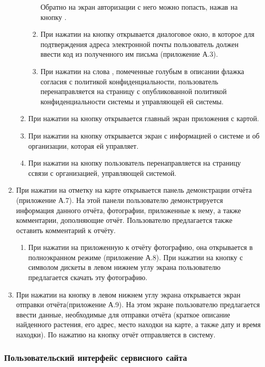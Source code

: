 \begin{enumerate}
\begin{enumerate}
\begin{enumerate}
			Обратно на экран авторизации с него можно попасть, нажав на кнопку .
			\item При нажатии на кнопку  открывается диалоговое окно, в которое для подтверждения адреса электронной почты пользователь должен ввести код из полученного им письма (приложение А.3).
			\item При нажатии на слова , помеченные голубым в описании флажка согласия с политикой конфиденциальности, пользователь перенаправляется на страницу с опубликованной политикой конфиденциальности системы и управляющей ей системы.
		\end{enumerate}
		\item При нажатии на кнопку  открывается главный экран приложения с картой.
		\item При нажатии на кнопку  открывается экран с информацией о системе и об организации, которая ей управляет.
		\item При нажатии на кнопку  пользователь перенаправляется на страницу ссвязи с организацией, управляющей системой.
	\end{enumerate}
	\item При нажатии на отметку на карте открывается панель демонстрации отчёта (приложение А.7).
	На этой панели пользователю демонстрируется информация данного отчёта, фотографии, приложенные к нему, а также комментарии, дополняющие отчёт.
	Пользователю предлагается также оставить комментарий к отчёту.
	\begin{enumerate}
		\item При нажатии на приложенную к отчёту фотографию, она открывается в полноэкранном режиме (приложение А.8).
		При нажатии на кнопку с символом дискеты в левом нижнем углу экрана пользователю предлагается скачать эту фотографию.
	\end{enumerate}
	\item При нажатии на кнопку \textquote{+} в левом нижнем углу экрана открывается экран отправки отчёта(приложение А.9).
	На этом экране пользователю предлагается ввести данные, необходимые для отправки отчёта (краткое описание найденного растения, его адрес, место находки на карте, а также дату и время находки).
	По нажатию на кнопку  отчёт отправляется в систему.
\end{enumerate}

\subsubsection{Пользовательский интерфейс сервисного сайта}

